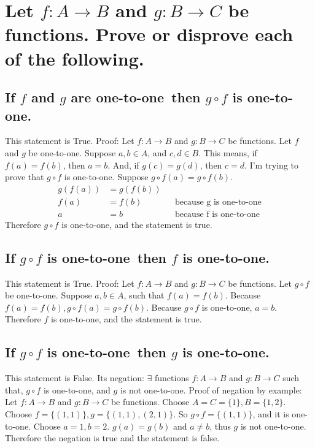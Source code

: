 \documentclass[10pt, letterpaper, titlepage]{article}
\newcommand{\0}{\varnothing}
\newcommand{\1}{\{ 1 \}}
\newcommand{\2}{\{ (1,1) \}}
\newcommand{\OTO}{one-to-one}
\newcommand{\gof}{g \circ f}
\begin{document}
    \section{Let $f : A \to B$ and $g : B \to C$ be functions. Prove or disprove each of the following.}
        \subsection{If $f$ and $g$ are \OTO \ then $\gof$ is \OTO.}
            This statement is True.
            Proof:
            Let $f : A \to B$ and $g : B \to C$ be functions.
            Let $f$ and $g$ be \OTO.
            Suppose $a, b \in A$, and $c, d \in B$.
            This means, if $f(a) = f(b)$, then $a = b$.
            And, if $g(c) = g(d)$, then $c = d$.
            I'm trying to prove that $\gof$ is \OTO.
            Suppose $\gof(a) = \gof(b)$.
            \begin{align*}
                g(f(a)) &= g(f(b)) && \\
                   f(a) &= f(b)    && \text{because g is \OTO}\\
                      a &= b       && \text{because f is \OTO}
            \end{align*}
            Therefore $\gof$ is \OTO, and the statement is true.

        \subsection{If $\gof$ is \OTO \ then $f$ is \OTO.}
            This statement is True.
            Proof:
            Let $f : A \to B$ and $g : B \to C$ be functions.
            Let $\gof$ be \OTO.
            Suppose $a, b \in A$, such that $f(a) = f(b)$.
            Because $f(a) = f(b), \gof(a) = \gof(b)$.
            Because $\gof$ is \OTO, $a = b$.
            Therefore $f$ is \OTO, and the statement is true.

        \subsection{If $\gof$ is \OTO \ then $g$ is \OTO.}
            This statement is False.
            Its negation: $\exists$ functions $f: A \to B$ and $g: B \to C$ such that, $\gof$ is \OTO, and $g$ is not \OTO.
            Proof of negation by example:
            Let $f : A \to B$ and $g : B \to C$ be functions.
            Choose $A = C = \1, B = \{ 1,2 \}$.
            Choose $f = \2, g = \{ (1,1), (2,1) \}$.
            So $\gof = \2$, and it is \OTO. 
            Choose $a = 1, b = 2$.
            $g(a) = g(b)$ and $a \neq b$, thus $g$ is not \OTO. 
            Therefore the negation is true and the statement is false.
        
\end{document}
